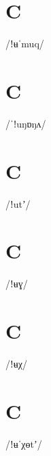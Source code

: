 \documentclass[10pt,a4paper,twoside]{book}
\begin{document}
\section*{C}

\begin{multicols}{3}
 {/ǃʉˈmuq/} {}
\end{multicols}

\section*{C}

\begin{multicols}{3}
 {/ˈǃuŋɒŋʌ/} {}
\end{multicols}

\section*{C}

\begin{multicols}{3}
 {/ǃutʼ/} {}
\end{multicols}

\section*{C}

\begin{multicols}{3}
 {/ǃʉɣ/} {}
\end{multicols}

\section*{C}

\begin{multicols}{3}
 {/ǃʉχ/} {}
\end{multicols}

\section*{C}

\begin{multicols}{3}
 {/ǃʉˈχɵtʼ/} {}
\end{multicols}
\end{document}
